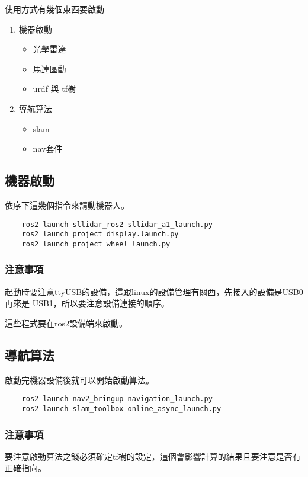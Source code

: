 使用方式有幾個東西要啟動
\begin{enumerate}
    \item 機器啟動
        \begin{itemize}
            \item 光學雷達
            \item 馬達區動
            \item urdf 與 tf樹
        \end{itemize}
    \item 導航算法
        \begin{itemize}
            \item slam
            \item nav套件
        \end{itemize}
\end{enumerate}
\subsection{機器啟動}
依序下這幾個指令來請動機器人。
\begin{tcolorbox}
\begin{verbatim}
    ros2 launch sllidar_ros2 sllidar_a1_launch.py
    ros2 launch project display.launch.py
    ros2 launch project wheel_launch.py
\end{verbatim}
\end{tcolorbox}
\subsubsection{注意事項}

起動時要注意ttyUSB的設備，這跟linux的設備管理有關西，先接入的設備是USB0再來是
USB1，所以要注意設備連接的順序。

這些程式要在ros2設備端來啟動。

\subsection{導航算法}
啟動完機器設備後就可以開始啟動算法。
\begin{tcolorbox}
\begin{verbatim}
    ros2 launch nav2_bringup navigation_launch.py
    ros2 launch slam_toolbox online_async_launch.py
\end{verbatim}
\end{tcolorbox}
\subsubsection{注意事項}
要注意啟動算法之錢必須確定tf樹的設定，這個會影響計算的結果且要注意是否有正確指向。
